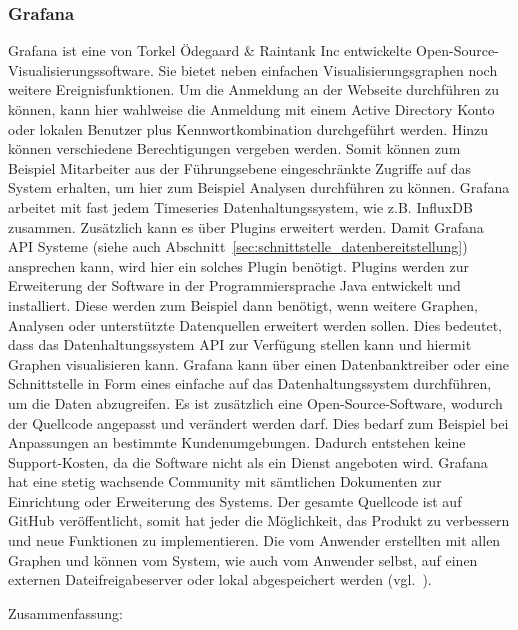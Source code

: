 \subsubsection{Grafana}
\label{subsubsec:grafana}
Grafana ist eine von Torkel Ödegaard \& Raintank Inc entwickelte
Open\hyp{}Source\hyp{}Visualisierungssoftware. Sie bietet neben einfachen
Visualisierungsgraphen noch weitere Ereignisfunktionen. Um die Anmeldung an der
Webseite durchführen zu können, kann hier wahlweise die Anmeldung mit einem
\gls{Active Directory} Konto oder lokalen Benutzer plus Kennwortkombination
durchgeführt werden. Hinzu können verschiedene Berechtigungen vergeben werden.
Somit können zum Beispiel Mitarbeiter aus der Führungsebene eingeschränkte
Zugriffe auf das System erhalten, um hier zum Beispiel Analysen durchführen zu
können. Grafana arbeitet mit fast jedem Timeseries Datenhaltungssystem, wie
z.B. InfluxDB zusammen. Zusätzlich kann es über Plugins erweitert werden. Damit
Grafana \gls{API} Systeme (siehe auch
Abschnitt~\ref{sec:schnittstelle_datenbereitstellung}) ansprechen kann, wird
hier ein solches Plugin benötigt. Plugins werden zur Erweiterung der Software
in der Programmiersprache Java entwickelt und installiert. Diese werden zum
Beispiel dann benötigt, wenn weitere Graphen, Analysen oder unterstützte
Datenquellen erweitert werden sollen. Dies bedeutet, dass das
Datenhaltungssystem \gls{API}  zur Verfügung
stellen kann und hiermit Graphen visualisieren kann. Grafana kann über einen
\gls{Datenbanktreiber} oder eine Schnittstelle in Form eines
 einfache  auf das
Datenhaltungssystem durchführen, um die Daten abzugreifen.  Es ist zusätzlich
eine Open\hyp{}Source\hyp{}Software, wodurch der Quellcode angepasst und
verändert werden darf. Dies bedarf zum Beispiel bei Anpassungen an bestimmte
Kundenumgebungen. Dadurch entstehen keine Support\hyp{}Kosten, da die Software
nicht als ein Dienst angeboten wird.  Grafana hat eine stetig wachsende
Community mit sämtlichen Dokumenten zur Einrichtung oder Erweiterung des
Systems. Der gesamte Quellcode ist auf \gls{GitHub} veröffentlicht, somit hat
jeder die Möglichkeit, das Produkt zu verbessern und neue Funktionen zu
implementieren. Die vom Anwender erstellten  mit
allen Graphen und  können vom System, wie auch
vom Anwender selbst, auf einen externen Dateifreigabeserver oder lokal
abgespeichert werden (vgl.~\cite{grafana}).

Zusammenfassung:

